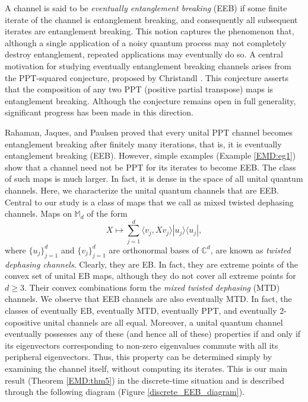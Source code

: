 \documentclass[11pt,reqno]{amsart}
\theoremstyle{definition}
\theoremstyle{plain}
\theoremstyle{remark}
\numberwithin{equation}{section}%
\begin{document}
 A channel is said to be \textit{eventually entanglement breaking} (EEB) if some finite iterate of the channel is entanglement breaking, and consequently all subsequent iterates are entanglement breaking. This notion captures the phenomenon that, although a single application of a noisy quantum process may not completely destroy entanglement, repeated applications may eventually do so.
A central motivation for studying eventually entanglement breaking channels arises from the PPT-squared conjecture, proposed by Christandl \cite{RusMB:JunM:DavK:HayP:AndW12, BCHW}. This conjecture asserts that the composition of any two PPT (positive partial transpose) maps is entanglement breaking. Although the conjecture remains open in full generality, significant progress has been made in this direction.

Rahaman, Jaques, and Paulsen \cite{RJP} proved that every unital PPT channel becomes entanglement breaking after finitely many iterations, that is, it is eventually entanglement breaking (EEB).  However, simple examples (Example \ref{EMD:eg1}) show that a channel need not be PPT for its iterates to become EEB. The class of such maps is much larger. In fact, it is dense in the space of all unital quantum channels. Here, we characterize the unital quantum channels that are EEB. Central to our study is a class of maps that we call as mixed twisted dephasing channels. Maps on $\mathbb{M}_d$ of the form
$$X\mapsto \sum _{j=1}^d \langle v_j, Xv_j\rangle |u_j\rangle \langle u_j|,$$
where $\{u_j\}_{j=1}^d$ and $\{v_j\}_{j=1}^d$ are orthonormal bases of $\mathbb{C}^d$, are known as \textit{twisted dephasing channels}. Clearly, they are EB. In fact, they are extreme points of the convex set of unital EB maps, although they do not cover all extreme points for $d\geq 3$. Their convex combinations form the \textit{mixed twisted dephasing} (MTD) channels. We observe that EEB channels are also eventually MTD. In fact, the classes of eventually EB, eventually MTD, eventually PPT, and eventually 2-copositive unital channels are all equal. Moreover, a unital quantum channel eventually possesses any of these  (and hence all of these) properties if and only if its eigenvectors corresponding to non-zero eigenvalues commute with all its peripheral eigenvectors. Thus, this property can be determined simply by examining the channel itself, without computing its iterates. This is our main result (Theorem \ref{EMD:thm5}) in the discrete-time situation and is described through the following diagram (Figure \ref{discrete_EEB_diagram}).
\end{document}
